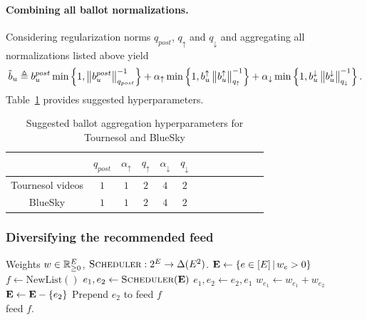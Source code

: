 \paragraph{Combining all ballot normalizations.}
Considering regularization norms $q_{post}$, $q_{\uparrow}$ and $q_\downarrow$
and aggregating all normalizations listed above yield
\begin{align}
    \tilde b_u 
    \triangleq  
        b_u^{post} \min \left\lbrace 1, \left\lVert{b_u^{post}}\right\rVert_{q_{post}}^{-1} \right\rbrace
        + \alpha_\uparrow \min \left\lbrace 1, b_u^\uparrow \left\lVert{b_u^\uparrow}\right\rVert_{q_\uparrow}^{-1} \right\rbrace
        + \alpha_\downarrow \min \left\lbrace 1, b_u^\downarrow \left\lVert{b_u^\downarrow}\right\rVert_{q_\downarrow}^{-1} \right\rbrace.
\end{align}
Table~\ref{table:aggregation_hyperparameters} provides 
suggested hyperparameters.

\begin{table}[h!]
\begin{center}
\begin{tabular}{ |c|c|c|c|c|c|c|c|c|c|c|c|c| } 
 \hline
                    & $q_{post}$ & $\alpha_\uparrow$ & $q_\uparrow$ & $\alpha_\downarrow$ & $q_\downarrow$ \\ \hline
 Tournesol videos   & $1$        & $1$               & $2$          & $4$                 & $2$ \\ \hline
 BlueSky            & $1$        & $1$               & $2$          & $4$                 & $2$ \\ 
 \hline
\end{tabular}
\caption{Suggested ballot aggregation hyperparameters for Tournesol and BlueSky} 
\label{table:aggregation_hyperparameters}
\end{center}
\end{table}


\subsubsection{Diversifying the recommended feed}
\label{sec:tille}

\begin{algorithm}
\caption{Tillé's pivot algorithm}\label{alg:pivot}
\begin{algorithmic}
\Require Weights $w \in \mathbb R_{\geq 0}^E$, $\textsc{Scheduler}: 2^E \to \Delta(E^2)$.
\State ${\bf E} \gets \left\lbrace e \in [E] \,\middle|\, w_e > 0 \right\rbrace$ 
\State $f \gets \mathrm{NewList}()$ 
    \State $e_1, e_2 \gets \textsc{Scheduler}({\bf E})$  
        
        \State $e_1, e_2 \gets e_2, e_1$     
    \EndIf
    \State $w_{e_1} \gets w_{e_1} + w_{e_2}$ 
    \State ${\bf E} \gets {\bf E} - \left\lbrace e_2 \right\rbrace$       
    \State Prepend $e_2$ to feed $f$         
\EndWhile \\
\Return feed $f$.
\end{algorithmic}
\end{algorithm}

